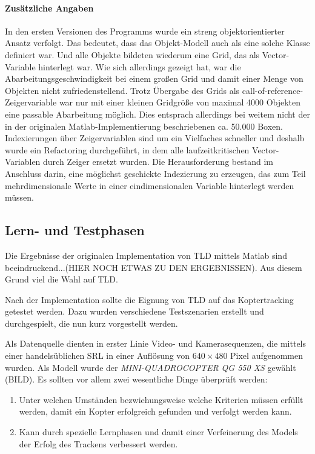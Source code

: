 \paragraph{Zusätzliche Angaben}
In den ersten Versionen des Programms wurde ein streng objektorientierter Ansatz verfolgt. Das bedeutet, dass das Objekt-Modell auch als eine solche Klasse definiert war. Und alle Objekte bildeten wiederum eine Grid, das als Vector-Variable hinterlegt war. Wie sich allerdings gezeigt hat, war die Abarbeitungsgeschwindigkeit bei einem großen Grid und damit einer Menge von Objekten nicht zufriedenstellend. Trotz Übergabe des Grids als call-of-reference-Zeigervariable war nur mit einer kleinen Gridgröße von maximal 4000 Objekten eine passable Abarbeitung möglich. Dies entsprach allerdings bei weitem nicht der in der originalen Matlab-Implementierung beschriebenen ca. 50.000 Boxen. Indexierungen über Zeigervariablen sind um ein Vielfaches schneller und deshalb wurde ein Refactoring durchgeführt, in dem alle laufzeitkritischen Vector-Variablen durch Zeiger ersetzt wurden. Die Herausforderung bestand im Anschluss darin, eine möglichst geschickte Indezierung zu erzeugen, das zum Teil mehrdimensionale Werte in einer eindimensionalen Variable hinterlegt werden müssen.

\subsection{Lern- und Testphasen}
\label{subsection:learning_and_testing}
Die Ergebnisse der originalen Implementation von TLD mittels Matlab sind beeindruckend...(HIER NOCH ETWAS ZU DEN ERGEBNISSEN). Aus diesem Grund viel die Wahl auf TLD.

Nach der Implementation sollte die Eignung von TLD auf das Koptertracking getestet werden. Dazu wurden verschiedene Testszenarien erstellt und durchgespielt, die nun kurz vorgestellt werden.

Als Datenquelle dienten in erster Linie Video- und Kamerasequenzen, die mittels einer handelsüblichen SRL in einer Auflösung von $640\times480$ Pixel aufgenommen wurden. Als Modell wurde der \textit{MINI-QUADROCOPTER QG 550 XS} gewählt (BILD). Es sollten vor allem zwei wesentliche Dinge überprüft werden:

\begin{enumerate}
\item Unter welchen Umständen bezwiehungsweise welche Kriterien müssen erfüllt werden, damit ein Kopter erfolgreich gefunden und verfolgt werden kann.
\item Kann durch spezielle Lernphasen und damit einer Verfeinerung des Models der Erfolg des Trackens verbessert werden.
\end{enumerate}

